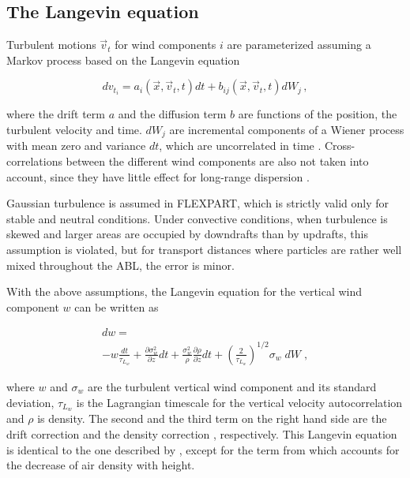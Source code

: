 \documentclass{egu}                  %
\begin{document}
\subsection{The Langevin equation}

Turbulent motions ${\vec{v}}_{t}$ for wind components $i$ are parameterized
assuming a Markov process based on the Langevin equation \citep{thomson1987}

\begin{equation}
dv_{t_i}=a_i({\vec{x}},{\vec{v}}_t,t)dt+b_{ij}({\vec{x}},{\vec{v}}_t,t)dW_
j \,,
\label{langevin}
\end{equation}

where the drift term $a$ and the diffusion term $b$ are functions of the
position, the turbulent velocity and time.  $dW_j$ are incremental components
of a Wiener process with mean zero and variance $dt$, which are uncorrelated in
time \citep{legg1982}.  Cross-correlations between the different wind
components are also not taken into account, since they have little effect for
long-range dispersion \citep{uliasz1994}.

Gaussian turbulence is assumed in FLEXPART, which is strictly valid only for
stable and neutral conditions.  Under convective conditions, when turbulence is
skewed and larger areas are occupied by downdrafts than by updrafts, this
assumption is violated, but for transport distances where particles are rather
well mixed throughout the ABL, the error is minor.

With the above assumptions, the Langevin equation for the vertical wind
component $w$ can be written as

\begin{multline}
d w = \\
- w \frac{dt}{\tau_{L_w}}
+ \frac{\partial \sigma_w^2}{\partial z} dt
+ \frac{\sigma_w^2}{\rho} \frac{\partial \rho}{\partial z} dt
+ \left( \frac{2}{\tau_{L_w}} \right)^{1/2} \sigma_w\; dW \;,
\label{legg}
\end{multline}

where $w$ and $\sigma_w$ are the turbulent vertical wind component and its
standard deviation, $\tau_{L_w}$ is the Lagrangian timescale for the vertical
velocity autocorrelation and $\rho$ is density.  The second and the third term
on the right hand side are the drift correction \citep{mcnider1988} and the
density correction \citep{stohlthomson1999}, respectively.  This Langevin
equation is identical to the one described by \citet{legg1982}, except for the
term from \citet{stohlthomson1999} which accounts for the decrease of air
density with height.
\end{document}
